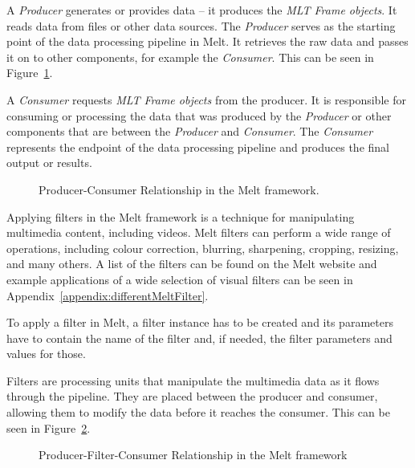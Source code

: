 \documentclass[../MasterThesis.tex]{subfiles}
\begin{document}
A \textit{Producer} generates or provides data -- it produces the \textit{MLT Frame objects}. 
It reads data from files or other data sources. The \textit{Producer} serves as the starting point of the data processing pipeline in Melt. It retrieves the raw data and passes it on to other components, for example the \textit{Consumer}. This can be seen in Figure~\ref{fig:producer_consumer}.

A \textit{Consumer} requests \textit{MLT Frame objects} from the producer.
It is responsible for consuming or processing the data that was produced by the \textit{Producer} or other components that are between the \textit{Producer} and \textit{Consumer}. 
The \textit{Consumer} represents the endpoint of the data processing pipeline and produces the final output or results.



\begin{figure}[H]
	\centering
	\caption{Producer-Consumer Relationship in the Melt framework.}
	\label{fig:producer_consumer}
\end{figure}

Applying filters in the Melt framework is a technique for manipulating multimedia content, including videos. 
Melt filters can perform a wide range of operations, including colour correction, blurring, sharpening, cropping, resizing, and many others. A list of the filters can be found on the Melt website and example applications of a wide selection of visual filters can be seen in Appendix~\ref{appendix:differentMeltFilter}.~\cite{melt_filters}

To apply a filter in Melt, a filter instance has to be created and its parameters have to contain the name of the filter and, if needed, the filter parameters and values for those.

Filters are processing units that manipulate the multimedia data as it flows through the pipeline. They are placed between the producer and consumer, allowing them to modify the data before it reaches the consumer. This can be seen in Figure~\ref{fig:producer_filter_consumer}.



\begin{figure}[H]
	\centering
	\caption{Producer-Filter-Consumer Relationship in the Melt framework}
	\label{fig:producer_filter_consumer}
\end{figure}
\end{document}

